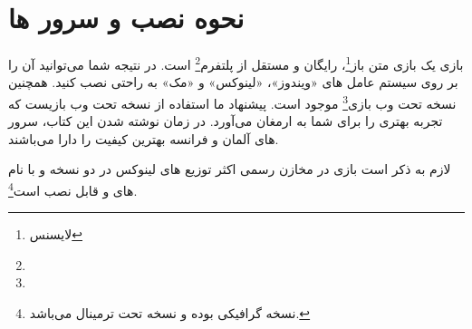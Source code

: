 \chapter*{نحوه نصب و سرور ها}

بازی  یک بازی متن باز\footnote{لایسنس }، رایگان و مستقل از پلتفرم\footnote{} است. در نتیجه شما می‌توانید آن را بر روی سیستم عامل های «ویندوز»، «لینوکس» و «مک» به راحتی نصب کنید. همچنین نسخه تحت وب بازی\footnote{} موجود است. پیشنهاد ما  استفاده از نسخه تحت وب بازیست که تجربه بهتری را برای شما به ارمغان می‌آورد. در زمان نوشته شدن این کتاب، سرور های آلمان و فرانسه بهترین کیفیت را دارا می‌باشند.

لازم به ذکر است بازی در مخازن رسمی اکثر توزیع های لینوکس در دو نسخه  و  با نام های  و  قابل نصب است\footnote{نسخه  گرافیکی بوده و نسخه  تحت ترمینال می‌باشد.}.
